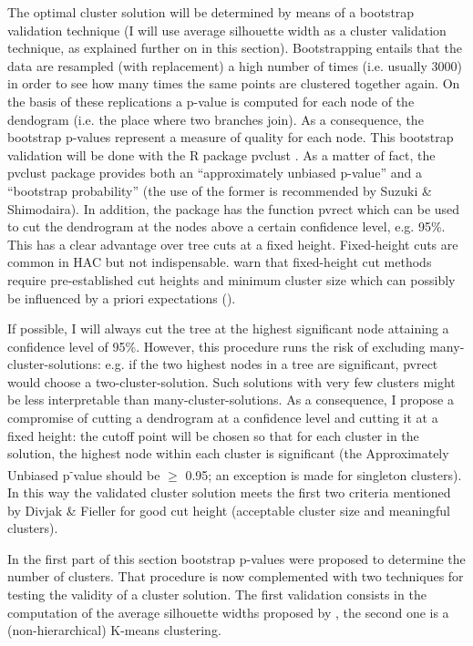 The optimal cluster solution will be determined by means of a bootstrap validation technique (I will use average silhouette width as a cluster validation technique, as explained further on in this section). Bootstrapping entails that the data are resampled (with replacement) a high number of times (i.e. usually 3000) in order to see how many times the same points are clustered together again. On the basis of these replications a p-value is computed for each node of the dendogram (i.e. the place where two branches join). As a consequence, the bootstrap p-values represent a measure of quality for each node. This bootstrap validation will be done with the R package pvclust \citep{suzuki_pvclust:_2006}. As a matter of fact, the pvclust package provides both an “approximately unbiased p-value” and a “bootstrap probability” (the use of the former is recommended by Suzuki \& Shimodaira). In addition, the package has the function pvrect which can be used to cut the dendrogram at the nodes above a certain confidence level, e.g. 95\%. This has a clear advantage over tree cuts at a fixed height. Fixed-height cuts are common in HAC but not indispensable. \citeauthor{everitt_cluster_2011} warn that fixed-height cut methods require pre-established cut heights and minimum cluster size which can possibly be influenced by a priori expectations (\citeyear[95]{everitt_cluster_2011}).

If possible, I will always cut the tree at the highest significant node attaining a confidence level of 95\%. However, this procedure runs the risk of excluding many-cluster-solutions: e.g. if the two highest nodes in a tree are significant, pvrect would choose a two-cluster-solution. Such solutions with very few clusters might be less interpretable than  many-cluster-solutions. As a consequence, I propose a compromise of cutting a dendrogram at a confidence level and cutting it at a fixed height: the cutoff point will be chosen so that for each cluster in the solution, the highest node within each cluster is significant (the Approximately Unbiased p\textsuperscript{{}-}value should be ${\geq}$ 0.95; an exception is made for singleton clusters). In this way the validated cluster solution meets the first two criteria mentioned by Divjak \& Fieller for good cut height (acceptable cluster size and meaningful clusters).

In the first part of this section bootstrap p-values were proposed to determine the number of clusters. That procedure is now complemented with two techniques for testing the validity of a cluster solution. The first validation consists in the computation of the average silhouette widths proposed by \citet{kaufman_finding_1990}, the second one is a (non-hierarchical) K-means clustering.

